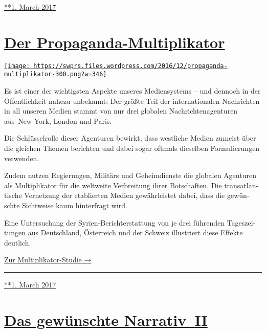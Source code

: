 \href{https://swprs.org/2017/03/01/abschied-von-usa-kritikern/}{**1.
March 2017}

\hypertarget{der-propaganda-multiplikator}{%
\section{\texorpdfstring{\href{https://swprs.org/2017/03/01/propaganda-multiplikator/}{Der
Propaganda-Multiplikator}}{Der Propaganda-Multiplikator}}\label{der-propaganda-multiplikator}}

\href{https://swprs.org/2017/03/01/propaganda-multiplikator/}{\texttt{[image: https://swprs.files.wordpress.com/2016/12/propaganda-multiplikator-300.png?w=346]}}

Es ist einer der wichtigsten Aspekte unseres Medien­systems -- und
dennoch in der Öf‌fent­lich­keit nahezu unbekannt: Der größte Teil der
inter­na­tio­nalen Nach­rich­ten in all unseren Medien stammt von nur
drei glo­balen Nach­rich­ten­agen­turen aus~New York, London und Paris.

Die Schlüssel­rolle dieser Agen­turen be­wirkt, dass west­liche Medien
zu­meist über die glei­chen The­men be­richten und dabei sogar oftmals
dieselben For­mu­lie­rungen ver­wenden.

Zu­dem nutzen Re­gie­rungen, Mi­li­tärs und Ge­heim­dienste die
glo­balen Agen­turen als Mul­ti­pli­kator für die welt­weite
Ver­brei­tung ihrer Bot­schaf‌ten. Die trans­at­lan­tische Ver­netzung
der eta­blier­ten Medien ge­währ­leis­tet da­bei, dass die ge­wün­schte
Sicht­weise kaum hin­ter­fragt wird.

Eine Unter­suchung der Syrien-Bericht­er­stat­tung von je drei
füh­ren­den Tages­zei­tungen aus Deutsch­land, Öster­reich und der
Schweiz illus­triert diese Ef‌fekte deutlich.

\href{https://swprs.org/der-propaganda-multiplikator/}{Zur
Multiplikator-Studie →}

\begin{center}\rule{0.5\linewidth}{\linethickness}\end{center}

\href{https://swprs.org/2017/03/01/propaganda-multiplikator/}{**1. March
2017}

\hypertarget{das-gewuxfcnschte-narrativ-ii}{%
\section{\texorpdfstring{\href{https://swprs.org/2017/03/01/das-gewuenschte-narrativ-ii/}{Das
gewünschte
Narrativ~II}}{Das gewünschte Narrativ~II}}\label{das-gewuxfcnschte-narrativ-ii}}

